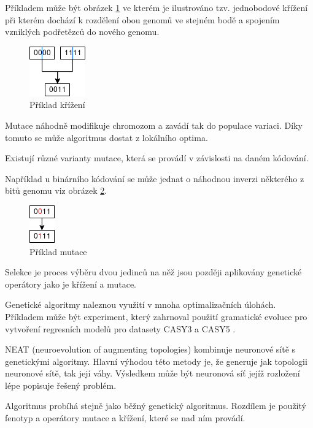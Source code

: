Příkladem může být obrázek \ref{fig:crossover} ve kterém je ilustrováno tzv. jednobodové křížení \cite[s.~50]{geneticCZ} při kterém dochází k rozdělení obou genomů ve stejném bodě a spojením vzniklých podřetězců do nového genomu.
	
\begin{figure}[ht]
	\centering
	\includegraphics[scale=0.95]{crossover}
	\caption{Příklad křížení}
	\label{fig:crossover}
\end{figure}

Mutace náhodně modifikuje chromozom a zavádí tak do populace variaci. Díky tomuto se může algoritmus dostat z lokálního optima. 

Existují různé varianty mutace, která se provádí v závislosti na daném kódování. 

Například u binárního kódování se může jednat o náhodnou inverzi některého z bitů genomu viz obrázek \ref{fig:mutation}.

\begin{figure}[h!]
	\centering
	\includegraphics[scale=1.0]{mutation}
	\caption{Příklad mutace}
	\label{fig:mutation}
\end{figure}

Selekce je proces výběru dvou jedinců na něž jsou později aplikovány genetické operátory jako je křížení a mutace. 

Genetické algoritmy naleznou využití v mnoha optimalizačních úlohách. Příkladem může být experiment, který zahrnoval použití gramatické evoluce pro vytvoření regresních modelů pro datasety CASY3 a CASY5 \cite[s.~2-9]{differentialEvolution}.

NEAT (neuroevolution of augmenting topologies) kombinuje neuronové sítě s genetickými algoritmy. Hlavní výhodou této metody je, že generuje jak topologii neuronové sítě, tak její váhy. Výsledkem může být neuronová síť jejíž rozložení lépe popisuje řešený problém.

Algoritmus probíhá stejně jako běžný genetický algoritmus. Rozdílem je použitý fenotyp a operátory mutace a křížení, které se nad ním provádí.

